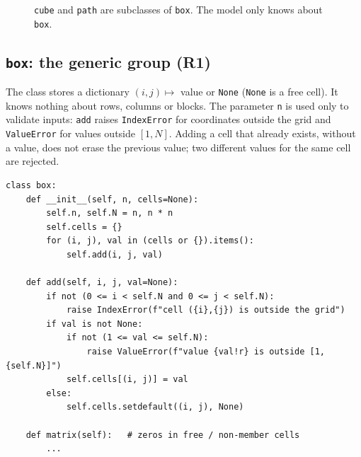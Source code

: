 \documentclass[11pt,a4paper]{article}
\begin{document}
\begin{figure}[h]
\centering
{}
\caption{\texttt{cube} and \texttt{path} are subclasses of \texttt{box}. The model only knows about \texttt{box}.}
\end{figure}

\subsection{\texttt{box}: the generic group (R1)}

The class stores a dictionary $(i,j)\mapsto$ value or \texttt{None} (\texttt{None} is a free cell). It knows nothing about rows, columns or blocks. The parameter \texttt{n} is used only to validate inputs: \texttt{add} raises \texttt{IndexError} for coordinates outside the grid and \texttt{ValueError} for values outside $[1,N]$. Adding a cell that already exists, without a value, does not erase the previous value; two different values for the same cell are rejected.

\begin{lstlisting}
class box:
    def __init__(self, n, cells=None):
        self.n, self.N = n, n * n
        self.cells = {}
        for (i, j), val in (cells or {}).items():
            self.add(i, j, val)

    def add(self, i, j, val=None):
        if not (0 <= i < self.N and 0 <= j < self.N):
            raise IndexError(f"cell ({i},{j}) is outside the grid")
        if val is not None:
            if not (1 <= val <= self.N):
                raise ValueError(f"value {val!r} is outside [1,{self.N}]")
            self.cells[(i, j)] = val
        else:
            self.cells.setdefault((i, j), None)

    def matrix(self):   # zeros in free / non-member cells
        ...
\end{lstlisting}
\end{document}
